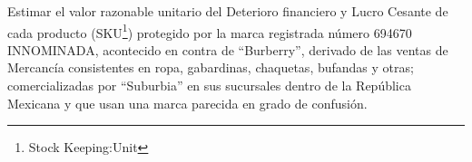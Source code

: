 Estimar el valor razonable unitario del Deterioro financiero y Lucro Cesante de cada producto (SKU\footnote{Stock Keeping:Unit}) protegido por la marca registrada número 694670 INNOMINADA, acontecido en contra de ``Burberry'', derivado de las ventas de Mercancía consistentes en ropa, gabardinas, chaquetas, bufandas y otras; comercializadas por ``Suburbia'' en sus sucursales dentro de la República Mexicana y que usan una marca parecida en grado de confusión.